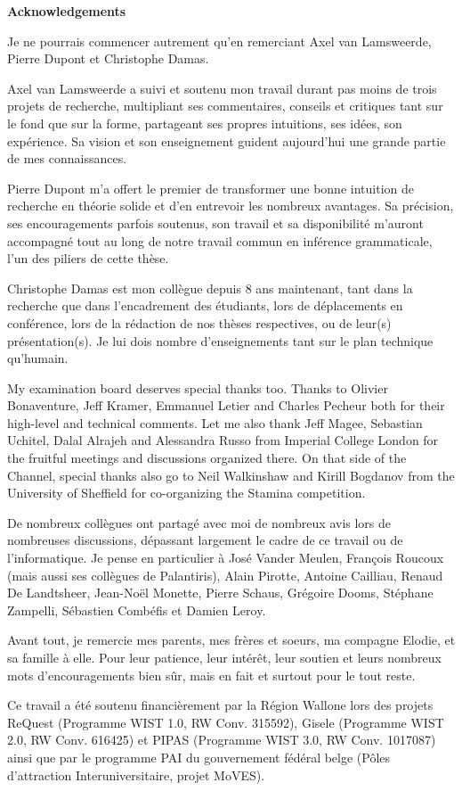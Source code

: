 \begin{center}
\textbf{\large Acknowledgements}
\end{center}

Je ne pourrais commencer autrement qu'en remerciant Axel van Lamsweerde, Pierre 
Dupont et Christophe Damas.

Axel van Lamsweerde a suivi et soutenu mon travail durant pas moins de trois 
projets de recherche, multipliant ses commentaires, conseils et critiques tant 
sur le fond que sur la forme, partageant ses propres intuitions, ses id\'ees,
son exp\'erience. Sa vision et son enseignement guident aujourd'hui une 
grande partie de mes connaissances.

Pierre Dupont m'a offert le premier de transformer une bonne intuition de 
recherche en th\'eorie solide et d'en entrevoir les nombreux avantages. Sa 
pr\'ecision, ses encouragements parfois soutenus, son travail et sa 
disponibilit\'e m'auront accompagn\'e tout au long de notre travail commun en 
inf\'erence grammaticale, l'un des piliers de cette th\`ese.

Christophe Damas est mon coll\`egue depuis 8 ans maintenant, tant dans la 
recherche que dans l'encadrement des \'etudiants, lors de d\'eplacements en 
conf\'erence, lors de la r\'edaction de nos th\`eses respectives, ou de leur(s) 
pr\'esentation(s). Je lui dois nombre d'enseignements tant sur le plan technique 
qu'humain.

My examination board deserves special thanks too. Thanks to Olivier Bonaventure, 
Jeff Kramer, Emmanuel Letier and Charles Pecheur both for their high-level and 
technical comments. Let me also thank Jeff Magee, Sebastian Uchitel, Dalal 
Alrajeh and Alessandra Russo from Imperial College London for the fruitful 
meetings and discussions organized there. On that side of the Channel, special 
thanks also go to Neil Walkinshaw and Kirill Bogdanov from the University of 
Sheffield for co-organizing the Stamina competition.

De nombreux coll\`egues ont partag\'e avec moi de nombreux avis lors de 
nombreuses discussions, d\'epassant largement le cadre de ce travail ou 
de l'informatique. Je pense en particulier \`a Jos\'e Vander Meulen, 
Fran\c{c}ois Roucoux (mais aussi ses coll\`egues de Palantiris), Alain Pirotte,
Antoine Cailliau, Renaud De Landtsheer, Jean-No\"el Monette, Pierre Schaus, 
Gr\'egoire Dooms, St\'ephane Zampelli, S\'ebastien Comb\'efis et Damien Leroy.

Avant tout, je remercie mes parents, mes fr\`eres et soeurs, ma compagne Elodie, 
et sa famille \`a elle. Pour leur patience, leur int\'er\^et, leur soutien et 
leurs nombreux mots d'encouragements bien s\^ur, mais en fait et surtout pour le 
tout reste.

Ce travail a \'et\'e soutenu financi\`erement par la R\'egion Wallone lors des 
projets ReQuest (Programme WIST 1.0, RW Conv. 315592), Gisele (Programme WIST 2.0, 
RW Conv. 616425) et PIPAS (Programme WIST 3.0, RW Conv. 1017087) ainsi que par 
le programme PAI du gouvernement f\'ed\'eral belge (P\^oles d'attraction 
Interuniversitaire, projet MoVES).
